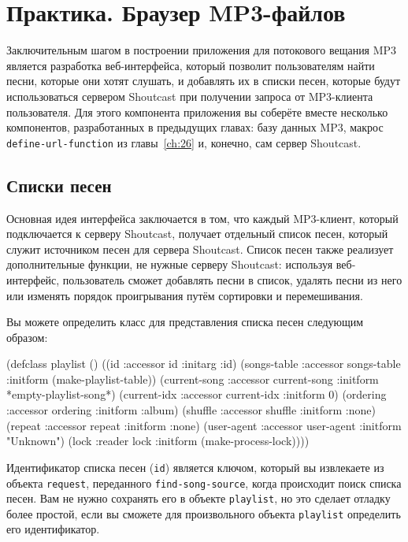 \chapter{Практика. Браузер MP3-файлов}
\label{ch:29}

\thispagestyle{empty}

Заключительным шагом в построении приложения для потокового вещания MP3 является
разработка веб-интерфейса, который позволит пользователям найти песни, которые они хотят
слушать, и добавлять их в списки песен, которые будут использоваться сервером Shoutcast при
получении запроса от MP3-клиента пользователя.  Для этого компонента приложения вы
соберёте вместе несколько компонентов, разработанных в предыдущих главах: базу данных MP3,
макрос \lstinline{define-url-function} из главы~\ref{ch:26} и, конечно, сам сервер Shoutcast.

\section{Списки песен}

Основная идея интерфейса заключается в том, что каждый MP3-клиент, который подключается к
серверу Shoutcast, получает отдельный список песен, который служит источником песен для
сервера Shoutcast.  Список песен также реализует дополнительные функции, не нужные серверу
Shoutcast: используя веб-интерфейс, пользователь сможет добавлять песни в список, удалять
песни из него или изменять порядок проигрывания путём сортировки и перемешивания.

Вы можете определить класс для представления списка песен следующим образом:

\begin{myverb}
(defclass playlist ()
  ((id           :accessor id           :initarg :id)
   (songs-table  :accessor songs-table  :initform (make-playlist-table))
   (current-song :accessor current-song :initform *empty-playlist-song*)
   (current-idx  :accessor current-idx  :initform 0)
   (ordering     :accessor ordering     :initform :album)
   (shuffle      :accessor shuffle      :initform :none)
   (repeat       :accessor repeat       :initform :none)
   (user-agent   :accessor user-agent   :initform "Unknown")
   (lock         :reader   lock         :initform (make-process-lock))))
\end{myverb}

Идентификатор списка песен (\lstinline{id}) является ключом, который вы извлекаете из объекта
\lstinline{request}, переданного \lstinline{find-song-source}, когда происходит поиск списка песен.
Вам не нужно сохранять его в объекте \lstinline{playlist}, но это сделает отладку более
простой, если вы сможете для произвольного объекта \lstinline{playlist} определить его
идентификатор.


